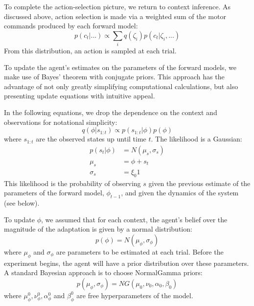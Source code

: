\documentclass[a4paper,doc,floatsintext,natbib]{apa6}%
\begin{document}
To complete the action-selection picture, we return to context inference. As
discussed above, action selection is made via a weighted sum of the motor commands
produced by each forward model:
\begin{equation}
p(c_t | ...) \propto \displaystyle \sum_{i} q(\zeta_i)p(c_t | \zeta_i, ...) \label{eqn:dist-comm}
\end{equation}
From this distribution, an action is sampled at each trial.

To update the agent's estimates on the parameters of the forward models, we
make use of Bayes' theorem with conjugate priors. This approach has the
advantage of not only greatly simplifying computational calculations, but also
presenting update equations with intuitive appeal.

In the following equations, we drop the dependence on the context and
observations for notational simplicity:
\begin{equation}
q(\phi | s_{1:t}) \propto p(s_{1:t} | \phi)p(\phi)
\end{equation}
where $s_{1:t}$ are the observed states up until time $t$. The likelihood is a
Gaussian:
\begin{align}
  p(s_t | \phi) &= N(\mu_s, \sigma_s)  \\
  \mu_s &= \phi + s_t \\
  \sigma_s &= \xi_0 1
\end{align}
This likelihood is the probability of observing $s$ given the previous estimate
of the parameters of the forward model, $\phi_{t-1}$, and given the dynamics of
the system (see below).

To update $\phi$, we assumed that for each context, the agent's belief over
the magnitude of the adaptation is given by a normal distribution:
\begin{equation}
p(\phi) = N(\mu_\phi, \sigma_\phi) \label{eqn:data-dist}
\end{equation}
where $\mu_\phi$ and $\sigma_\phi$ are parameters to be estimated at each
trial. Before the experiment begins, the agent will have a prior distribution
over these parameters. A standard Bayesian approach is to choose NormalGamma
priors:
\begin{equation}
p(\mu_\phi, \sigma_\phi) = NG(\mu_0, \nu_0, \alpha_0, \beta_0)
\end{equation}
where $\mu_{\phi}^0, \nu_{\phi}^0, \alpha_{\phi}^0$ and $\beta_{\phi}^0$ are free
hyperparameters of the model.
\end{document}
